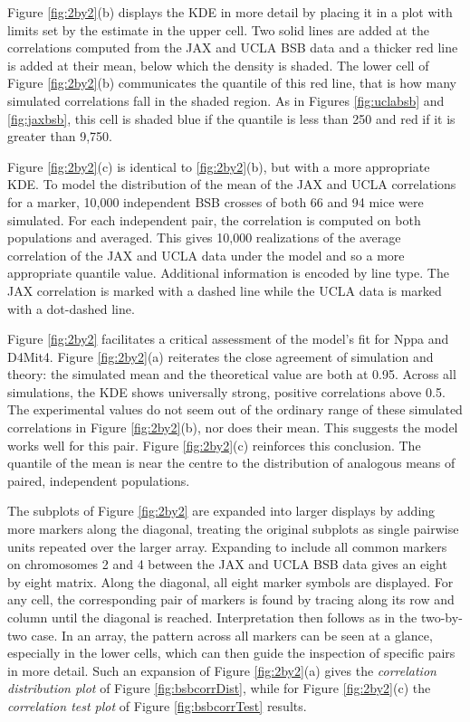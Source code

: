 \documentclass[sts]{imsart}
\begin{document}
Figure \ref{fig:2by2}(b) displays the KDE in more detail by placing it in a plot with limits set by the estimate in the upper cell. Two solid lines are added at the correlations computed from the JAX and UCLA BSB data and a thicker red line is added at their mean, below which the density is shaded. The lower cell of Figure \ref{fig:2by2}(b) communicates the quantile of this red line, that is how many simulated correlations fall in the shaded region. As in Figures \ref{fig:uclabsb} and \ref{fig:jaxbsb}, this cell is shaded blue if the quantile is less than 250 and red if it is greater than 9,750.

Figure \ref{fig:2by2}(c) is identical to \ref{fig:2by2}(b), but with a more appropriate KDE. To model the distribution of the mean of the JAX and UCLA correlations for a marker, 10,000 independent BSB crosses of both 66 and 94 mice were simulated. For each independent pair, the correlation is computed on both populations and averaged. This gives 10,000 realizations of the average correlation of the JAX and UCLA data under the model and so a more appropriate quantile value. Additional information is encoded by line type. The JAX correlation is marked with a dashed line while the UCLA data is marked with a dot-dashed line.

Figure \ref{fig:2by2} facilitates a critical assessment of the model's fit for Nppa and D4Mit4. Figure \ref{fig:2by2}(a) reiterates the close agreement of simulation and theory: the simulated mean and the theoretical value are both at 0.95. Across all simulations, the KDE shows universally strong, positive correlations above 0.5. The experimental values do not seem out of the ordinary range of these simulated correlations in Figure \ref{fig:2by2}(b), nor does their mean. This suggests the model works well for this pair. Figure \ref{fig:2by2}(c) reinforces this conclusion. The quantile of the mean is near the centre to the distribution of analogous means of paired, independent populations.

The subplots of Figure \ref{fig:2by2} are expanded into larger displays by adding more markers along the diagonal, treating the original subplots as single pairwise units repeated over the larger array. Expanding to include all common markers on chromosomes 2 and 4 between the JAX and UCLA BSB data gives an eight by eight matrix. Along the diagonal, all eight marker symbols are displayed. For any cell, the corresponding pair of markers is found by tracing along its row and column until the diagonal is reached. Interpretation then follows as in the two-by-two case. In an array, the pattern across all markers can be seen at a glance, especially in the lower cells, which can then guide the inspection of specific pairs in more detail. Such an expansion of Figure \ref{fig:2by2}(a) gives the \emph{correlation distribution plot} of Figure \ref{fig:bsbcorrDist}, while for Figure \ref{fig:2by2}(c) the \emph{correlation test plot} of Figure \ref{fig:bsbcorrTest} results.
\end{document}
